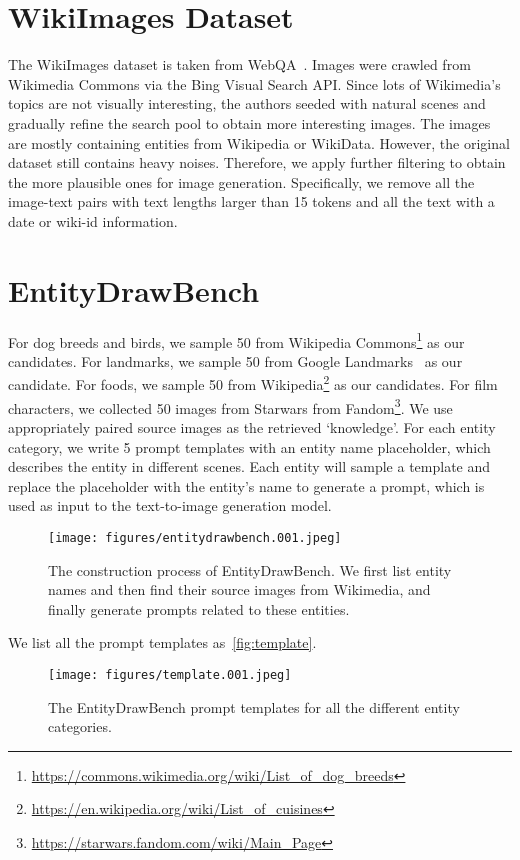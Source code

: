 \documentclass{article} \usepackage{iclr2023_conference,times}
\begin{document}
\section{WikiImages Dataset}
\label{wikiimages}
The WikiImages dataset is taken from WebQA~\citep{chang2022webqa}. Images were crawled from Wikimedia Commons via the Bing Visual Search API. Since lots of Wikimedia’s topics are not visually interesting, the authors seeded with natural scenes and gradually refine the search pool to obtain more interesting images. The images are mostly containing entities from Wikipedia or WikiData. However, the original dataset still contains heavy noises. Therefore, we apply further filtering to obtain the more plausible ones for image generation. Specifically, we remove all the image-text pairs with text lengths larger than 15 tokens and all the text with a date or wiki-id information. 




\clearpage
\section{EntityDrawBench}
\label{entitydrawbench}
For dog breeds and birds, we sample 50 from Wikipedia Commons\footnote{\small{\url{ https://commons.wikimedia.org/wiki/List_of_dog_breeds}}} as our candidates. For landmarks, we sample 50 from Google Landmarks~\citep{weyand2020google} as our candidate. For foods, we sample 50 from Wikipedia\footnote{\small{\url{https://en.wikipedia.org/wiki/List_of_cuisines}}} as our candidates. For film characters, we collected 50 images from Starwars from Fandom\footnote{\small\url{https://starwars.fandom.com/wiki/Main_Page}}. We use appropriately paired source images as the retrieved `knowledge'. For each entity category, we write 5 prompt templates with an entity name placeholder, which describes the entity in different scenes. Each entity will sample a template and replace the placeholder with the entity's name to generate a prompt, which is used as input to the text-to-image generation model.
\begin{figure}[!h]
    \centering
    \texttt{[image: figures/entitydrawbench.001.jpeg]}
    \caption{{The construction process of EntityDrawBench}. We first list entity names and then find their source images from Wikimedia, and finally generate prompts related to these entities. }
    \label{fig:entitybench}
\end{figure}



We list all the prompt templates as~\autoref{fig:template}.
\begin{figure}[!h]
    \centering
    \texttt{[image: figures/template.001.jpeg]}
    \caption{The EntityDrawBench prompt templates for all the different entity categories. }
    \label{fig:template}
\end{figure}
\end{document}
